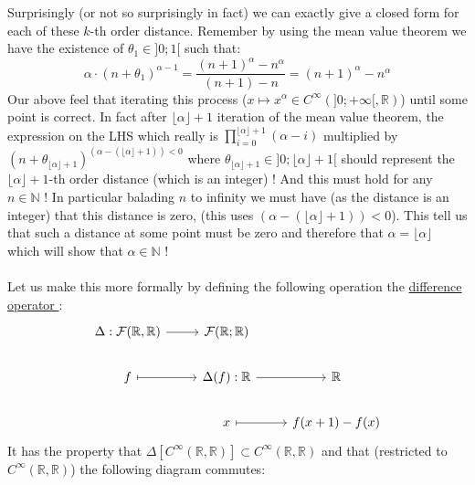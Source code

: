 \begin{solution}
    \\\\
    Surprisingly (or not so surprisingly in fact) we can exactly give a closed form for each of these \( k \)-th order distance. Remember by using the mean value theorem we have the existence of \( \theta_{1}\in]0;1[ \) such that:
    \[
        \alpha\cdot \left(n+\theta_1\right)^{\alpha-1}=\frac{\left(n+1\right)^{\alpha}-n^{\alpha}}{\left(n+1\right)-n}=\left(n+1\right)^{\alpha}-n^{\alpha}
    \]
    Our above feel that iterating this process (\( x\mapsto x^{\alpha}\in C^{\infty}(]0;+\infty[,\mathbb{R}) \)) until some point is correct. In fact after \( \lfloor\alpha\rfloor+1 \) iteration of the mean value theorem, the expression on the LHS which really is \( \prod_{i=0}^{\lfloor\alpha\rfloor+1}\left(\alpha-i\right) \) multiplied by \( \left(n+\theta_{\lfloor\alpha\rfloor+1}\right)^{\left(\alpha-\left(\lfloor\alpha\rfloor+1\right)\right)<0} \) where \( \theta_{\lfloor\alpha\rfloor+1}\in]0;\lfloor\alpha\rfloor+1[ \) should represent the \( \lfloor\alpha\rfloor+1 \)-th order distance (which is an integer) ! And this must hold for any \( n\in\mathbb{N} \) ! In particular balading \( n \) to infinity we must have (as the distance is an integer) that this distance is zero, (this uses \( \left(\alpha-\left(\lfloor\alpha\rfloor+1\right)\right)<0 \)). This tell us that such a distance at some point must be zero and therefore that \( \alpha=\lfloor\alpha\rfloor \) which will show that \( \alpha\in\mathbb{N} \) !
    \\\\
    Let us make this more formally by defining the following operation the \href{https://en.m.wikipedia.org/wiki/Finite_difference}{difference operator }:
    \[\begin{tikzcd}
            {\Delta:\mathcal{F}(\mathbb{R},\mathbb{R})} & {\mathcal{F}(\mathbb{R};\mathbb{R})} \\
            f & {\Delta(f):\mathbb{R}} & {\mathbb{R}} \\
            & x & {f(x+1)-f(x)}
            \arrow[from=1-1, to=1-2]
            \arrow[maps to, from=2-1, to=2-2]
            \arrow[from=2-2, to=2-3]
            \arrow[maps to, from=3-2, to=3-3]
        \end{tikzcd}\]
    It has the property that \( \Delta\left[C^{\infty}\left(\mathbb{R},\mathbb{R}\right)\right]\subset C^{\infty}\left(\mathbb{R},\mathbb{R}\right) \) and that (restricted to \( C^{\infty}\left(\mathbb{R},\mathbb{R}\right) \)) the following diagram commutes:
    \[\begin{tikzcd}

\end{tikzcd}\]
\end{solution}
